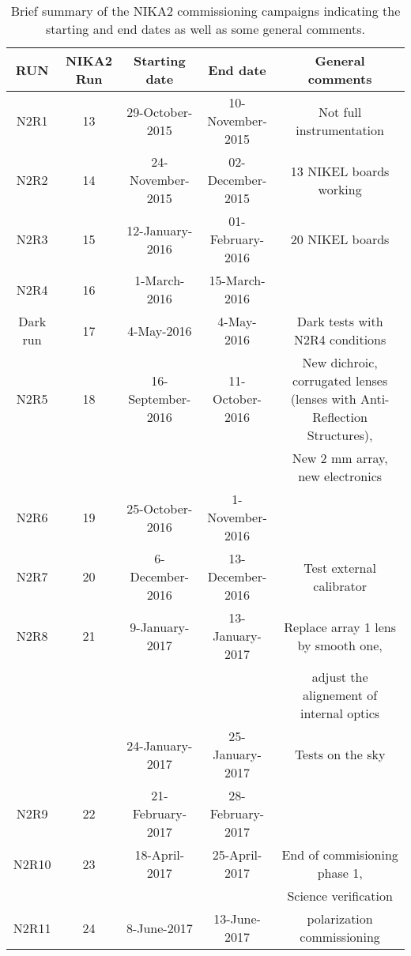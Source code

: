 \begin{table}[h]
\small
\begin{center} 
\begin{tabular}{|c|c|c|c|c|}
\hline 
RUN  & NIKA2 Run & Starting date    & End date         &  General comments \\
\hline
N2R1     & 13       & 29-October-2015   & 10-November-2015 & Not full instrumentation        \\
N2R2     & 14       & 24-November-2015  & 02-December-2015 & 13 NIKEL boards working         \\
N2R3     & 15       & 12-January-2016   & 01-February-2016 & 20 NIKEL boards                 \\
N2R4     & 16       & 1-March-2016      & 15-March-2016    & 	                               \\
Dark run & 17       & 4-May-2016        & 4-May-2016       & Dark tests with N2R4 conditions  \\
\hline
N2R5     & 18       & 16-September-2016 & 11-October-2016  & New dichroic, corrugated lenses (lenses with Anti-Reflection Structures), \\
         &          &                   &                  &  New 2 mm array, new electronics \\
N2R6     & 19       & 25-October-2016   & 1-November-2016  &                                  \\
N2R7     & 20       & 6-December-2016   & 13-December-2016 & Test external calibrator         \\
N2R8     & 21       & 9-January-2017    & 13-January-2017  & Replace array 1 lens by smooth one, \\
         &          &                   &                  &  adjust the alignement of internal optics \\ 
         &          & 24-January-2017   & 25-January-2017  & Tests on the sky   \\
N2R9     & 22       & 21-February-2017  & 28-February-2017 &                                   \\
N2R10    & 23       & 18-April-2017     & 25-April-2017    & End of commisioning phase 1,     \\
         &          &                   &                  & Science verification  \\  
N2R11    & 24       &  8-June-2017      & 13-June-2017     &  polarization commissioning  \\
\hline
\end{tabular}
\caption[Commissioning campaigns, dates and general comments.]{
Brief summary of the NIKA2 commissioning campaigns indicating the starting and end dates as well as
some general comments.
\label{nika2runs}}
\end{center} 
\end{table} 

